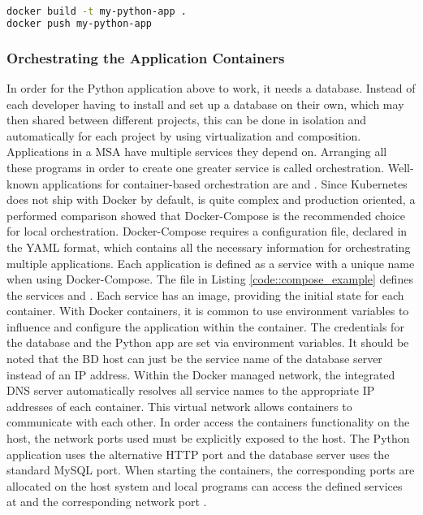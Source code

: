 \begin{lstlisting}[language=bash, frame=none, numbers=none, backgroundcolor=\color{codebg}]
docker build -t my-python-app .
docker push my-python-app
\end{lstlisting}
\vspace{-1cm}

        \subsubsection{Orchestrating the Application Containers}
        In order for the Python application above to work, it needs a database. Instead of each developer having to install and set up a database on their own, which may then shared between different projects, this can be done in isolation and automatically for each project by using virtualization and composition. Applications in a \ac{MSA} have multiple services they depend on. Arranging all these programs in order to create one greater service is called orchestration. Well-known applications for container-based orchestration are  and . Since Kubernetes does not ship with Docker by default, is quite complex and production oriented, a performed comparison showed that Docker-Compose is the recommended choice for local orchestration.\newline
        Docker-Compose requires a configuration file, declared in the \acs{YAML} format, which contains all the necessary information for orchestrating multiple applications. Each application is defined as a service with a unique name when using Docker-Compose. The  file in Listing \ref{code::compose_example} defines the services  and . Each service has an image, providing the initial state for each container. With Docker containers, it is common to use environment variables to influence and configure the application within the container. The credentials for the database and the Python app are set via environment variables. It should be noted that the BD host can just be the service name of the database server instead of an IP address. Within the Docker managed network, the integrated \ac{DNS} server automatically resolves all service names to the appropriate IP addresses of each container. This virtual network allows containers to communicate with each other. In order access the containers functionality on the host, the network ports used must be explicitly exposed to the host. The Python application uses the alternative \acs{HTTP} port  and the database server uses the standard MySQL port. When starting the containers, the corresponding ports are allocated on the host system and local programs can access the defined services at  and the corresponding network port \cite{dockerdocs}.\newline
